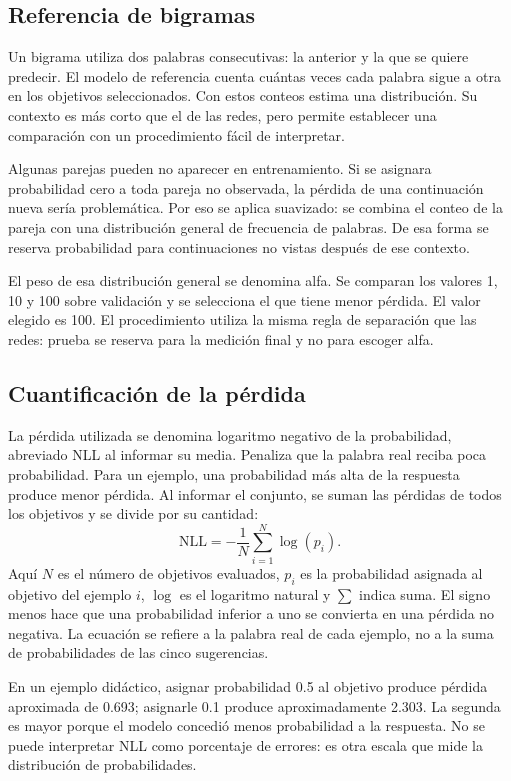 \subsection{Referencia de bigramas}
Un bigrama utiliza dos palabras consecutivas: la anterior y la que se quiere predecir. El modelo de referencia cuenta cuántas veces cada palabra sigue a otra en los objetivos seleccionados. Con estos conteos estima una distribución. Su contexto es más corto que el de las redes, pero permite establecer una comparación con un procedimiento fácil de interpretar.

Algunas parejas pueden no aparecer en entrenamiento. Si se asignara probabilidad cero a toda pareja no observada, la pérdida de una continuación nueva sería problemática. Por eso se aplica suavizado: se combina el conteo de la pareja con una distribución general de frecuencia de palabras. De esa forma se reserva probabilidad para continuaciones no vistas después de ese contexto.

El peso de esa distribución general se denomina alfa. Se comparan los valores 1, 10 y 100 sobre validación y se selecciona el que tiene menor pérdida. El valor elegido es 100. El procedimiento utiliza la misma regla de separación que las redes: prueba se reserva para la medición final y no para escoger alfa.

\subsection{Cuantificación de la pérdida}
La pérdida utilizada se denomina logaritmo negativo de la probabilidad, abreviado NLL al informar su media. Penaliza que la palabra real reciba poca probabilidad. Para un ejemplo, una probabilidad más alta de la respuesta produce menor pérdida. Al informar el conjunto, se suman las pérdidas de todos los objetivos y se divide por su cantidad:
\begin{equation}\label{eq:nll_nueva}
\mathrm{NLL}=-\frac{1}{N}\sum_{i=1}^{N}\log(p_i).
\end{equation}
Aquí $N$ es el número de objetivos evaluados, $p_i$ es la probabilidad asignada al objetivo del ejemplo $i$, $\log$ es el logaritmo natural y $\sum$ indica suma. El signo menos hace que una probabilidad inferior a uno se convierta en una pérdida no negativa. La ecuación se refiere a la palabra real de cada ejemplo, no a la suma de probabilidades de las cinco sugerencias.

En un ejemplo didáctico, asignar probabilidad 0.5 al objetivo produce pérdida aproximada de 0.693; asignarle 0.1 produce aproximadamente 2.303. La segunda es mayor porque el modelo concedió menos probabilidad a la respuesta. No se puede interpretar NLL como porcentaje de errores: es otra escala que mide la distribución de probabilidades.

